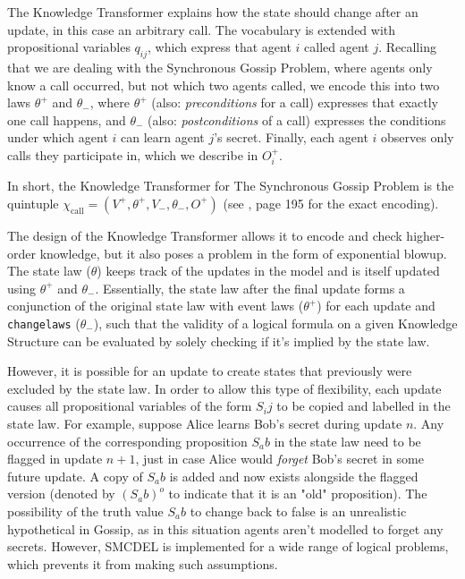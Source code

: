 The Knowledge Transformer explains how the state should change after an update, in this case an arbitrary call. 
The vocabulary is extended with propositional variables $q_{ij}$, which express that agent $i$ called agent $j$. 
Recalling that we are dealing with the Synchronous Gossip Problem, where agents only know a call occurred, 
but not which two agents called, we encode this into two laws $\theta^+$ and $\theta_-$, where $\theta^+$ 
(also: \textit{preconditions} for a call) expresses that exactly one 
call happens, and $\theta_-$ (also: \textit{postconditions} of a call) expresses the conditions under which agent $i$ can 
learn agent $j$'s secret. 
Finally, each agent $i$ observes only calls they participate in, which we describe in $O^+_i$. 

In short, the Knowledge Transformer for The Synchronous Gossip Problem is the quintuple 
$\chi_\text{call}=(V^+,\theta ^+,V_-,\theta _-,O^+)$ (see \cite{GattingerThesis2018}, page 195 for the exact encoding).

The design of the Knowledge Transformer allows it to encode and check higher-order knowledge, but it 
also poses a problem in the form of exponential blowup. The state law ($\theta$) keeps track 
of the updates in the model and is itself updated using $\theta^+$ and $\theta_-$. Essentially, the state law 
after the final update forms a conjunction of the original state law with event laws ($\theta^+$) for each update and 
\texttt{changelaws} ($\theta_-$), 
such that the validity of a logical formula on a given Knowledge Structure can be evaluated by solely checking if it's implied by 
the state law. 

However, it is possible for an update to create states that previously were excluded by the state law. 
In order to allow this type of flexibility, each update causes all propositional variables of the form $S_ij$  
to be copied and labelled in the state law. For example, suppose Alice learns Bob's secret during update $n$. 
Any occurrence of the corresponding proposition $S_ab$ in the state law need to be flagged in update $n+1$, just in case 
Alice would \textit{forget} Bob's secret in some future update. A copy of $S_ab$ is added and now exists alongside the 
flagged version (denoted by $(S_ab)^o$ to indicate that it is an "old" proposition). 
The possibility of the truth value $S_ab$ to change back to false is an unrealistic hypothetical in Gossip, as in this situation 
agents aren't modelled to forget any secrets. However, SMCDEL is implemented for a wide range of logical problems, which prevents it 
from making such assumptions. 


